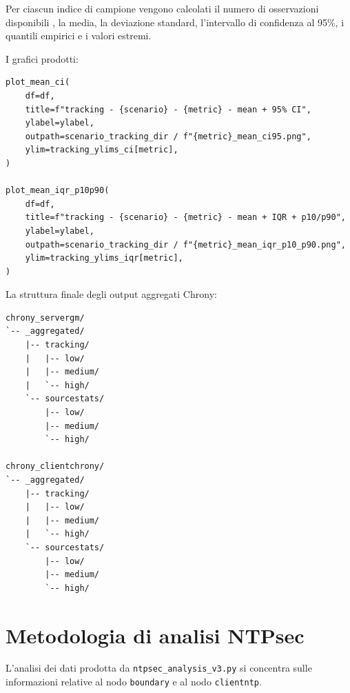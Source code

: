 Per ciascun indice di campione vengono calcolati il numero di osservazioni disponibili
, la media, la deviazione standard, l'intervallo di confidenza al 95\%, i quantili empirici e i valori
estremi.

I grafici prodotti:

\begin{listing}[H]
\begin{verbatim}
plot_mean_ci(
    df=df,
    title=f"tracking - {scenario} - {metric} - mean + 95% CI",
    ylabel=ylabel,
    outpath=scenario_tracking_dir / f"{metric}_mean_ci95.png",
    ylim=tracking_ylims_ci[metric],
)

plot_mean_iqr_p10p90(
    df=df,
    title=f"tracking - {scenario} - {metric} - mean + IQR + p10/p90",
    ylabel=ylabel,
    outpath=scenario_tracking_dir / f"{metric}_mean_iqr_p10_p90.png",
    ylim=tracking_ylims_iqr[metric],
)
\end{verbatim}
\caption{Produzione dei grafici aggregati per le metriche di tracking Chrony.}
\label{lst:chrony-plot-generation}
\end{listing}

La struttura finale degli output aggregati Chrony:

\begin{listing}[H]
\begin{verbatim}
chrony_servergm/
`-- _aggregated/
    |-- tracking/
    |   |-- low/
    |   |-- medium/
    |   `-- high/
    `-- sourcestats/
        |-- low/
        |-- medium/
        `-- high/

chrony_clientchrony/
`-- _aggregated/
    |-- tracking/
    |   |-- low/
    |   |-- medium/
    |   `-- high/
    `-- sourcestats/
        |-- low/
        |-- medium/
        `-- high/
\end{verbatim}
\caption{Organizzazione degli output aggregati prodotti dal parser Chrony.}
\label{lst:chrony-output-structure}
\end{listing}

\section{Metodologia di analisi NTPsec}

L'analisi dei dati prodotta da \texttt{ntpsec\_analysis\_v3.py} si concentra sulle
informazioni relative al nodo \texttt{boundary} e al nodo \texttt{clientntp}.

